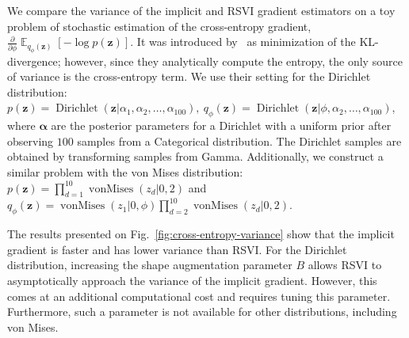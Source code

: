 \documentclass{article}
\DeclareMathOperator{\E}{\mathbb{E}}
\let\vec\bm
\begin{document}
We compare the variance of the implicit and RSVI gradient estimators on a toy problem of stochastic estimation of the cross-entropy gradient, $\frac{\partial}{\partial \phi} \E_{q_{\phi} (\vec{z})} [-\log p(\vec{z})]$.
It was introduced by~\citet{naesseth2017reparameterization} as minimization of the KL-divergence; however, since they analytically compute the entropy, the only source of variance is the cross-entropy term.
We use their setting for the Dirichlet distribution: $p(\vec{z}) = \operatorname{Dirichlet}(\vec{z} | \alpha_1, \alpha_2, \dots, \alpha_{100}),\ q_{\phi} (\vec{z}) = \operatorname{Dirichlet}(\vec{z} | \phi, \alpha_2, \dots, \alpha_{100})$, where $\vec{\alpha}$ are the posterior parameters for a Dirichlet with a uniform prior after observing $100$ samples from a Categorical distribution.
The Dirichlet samples are obtained by transforming samples from Gamma.
Additionally, we construct a similar problem with the von Mises distribution: $p(\vec{z}) = \prod_{d=1}^{10} \operatorname{vonMises}(z_d | 0, 2)$ and $q_{\phi} (\vec{z}) = \operatorname{vonMises}(z_1 | 0, \phi) \prod_{d=2}^{10} \operatorname{vonMises}(z_d | 0, 2)$.

The results presented on Fig.~\ref{fig:cross-entropy-variance} show that the implicit gradient is faster and has lower variance than RSVI.
For the Dirichlet distribution, increasing the shape augmentation parameter $B$ allows RSVI to asymptotically approach the variance of the implicit gradient.
However, this comes at an additional computational cost and requires tuning this parameter.
Furthermore, such a parameter is not available for other distributions, including von Mises.
\end{document}
